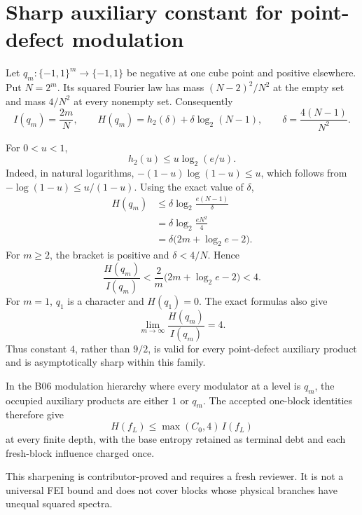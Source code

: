 \section*{Sharp auxiliary constant for point-defect modulation}

Let \(q_m:\{-1,1\}^m\to\{-1,1\}\) be negative at one cube point
and positive elsewhere. Put \(N=2^m\). Its squared Fourier law has mass
\((N-2)^2/N^2\) at the empty set and mass \(4/N^2\) at every nonempty set.
Consequently
\[
 I(q_m)=\frac{2m}{N},
 \qquad
 H(q_m)=h_2(\delta)+\delta\log_2(N-1),
 \qquad
 \delta=\frac{4(N-1)}{N^2}.
\]

For \(0<u<1\),
\[
 h_2(u)\le u\log_2(e/u).
\]
Indeed, in natural logarithms,
\(-(1-u)\log(1-u)\le u\), which follows from
\(-\log(1-u)\le u/(1-u)\).
Using the exact value of \(\delta\),
\[
\begin{aligned}
 H(q_m)
 &\le \delta\log_2\frac{e(N-1)}{\delta}\\
 &=\delta\log_2\frac{eN^2}{4}\\
 &=\delta\bigl(2m+\log_2e-2\bigr).
\end{aligned}
\]
For \(m\ge2\), the bracket is positive and \(\delta<4/N\). Hence
\[
 \frac{H(q_m)}{I(q_m)}
 <
 \frac{2}{m}\bigl(2m+\log_2e-2\bigr)
 <4.
\]
For \(m=1\), \(q_1\) is a character and \(H(q_1)=0\).
The exact formulas also give
\[
 \lim_{m\to\infty}\frac{H(q_m)}{I(q_m)}=4.
\]
Thus constant \(4\), rather than \(9/2\), is valid for every point-defect
auxiliary product and is asymptotically sharp within this family.

In the B06 modulation hierarchy where every modulator at a level is \(q_m\),
the occupied auxiliary products are either \(1\) or \(q_m\). The accepted
one-block identities therefore give
\[
 H(f_L)\le\max(C_0,4)\,I(f_L)
\]
at every finite depth, with the base entropy retained as terminal debt and
each fresh-block influence charged once.

This sharpening is contributor-proved and requires a fresh reviewer. It is
not a universal FEI bound and does not cover blocks whose physical branches
have unequal squared spectra.
